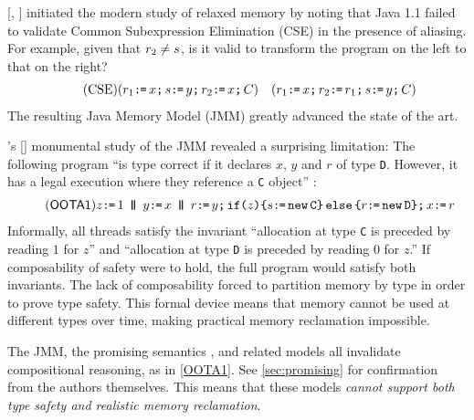 \citeauthor{DBLP:conf/java/Pugh99} [\citeyear{DBLP:conf/java/Pugh99},
] initiated the modern study of relaxed memory by noting that
Java 1.1 failed to validate Common Subexpression Elimination (CSE) in the
presence of aliasing. For example, given that $r_2\neq s$, is it valid
to transform the program on the left to that on the right?
\begin{align*}
\tag{CSE}\label{CSE1}
  ({r_1\texttt{:}\mkern-1mu\texttt{=}\, x \texttt{;}\,\allowbreak
  s\texttt{:}\mkern-1mu\texttt{=}\, y \texttt{;}\,\allowbreak  
  r_2\texttt{:}\mkern-1mu\texttt{=}\, x\texttt{;}\,\allowbreak C})
&&
  ({r_1\texttt{:}\mkern-1mu\texttt{=}\, x \texttt{;}\,\allowbreak     
    r_2\texttt{:}\mkern-1mu\texttt{=}\, r_1\texttt{;}\,\allowbreak
    s\texttt{:}\mkern-1mu\texttt{=}\, y \texttt{;}\,\allowbreak C})
\end{align*}
The resulting Java Memory Model (JMM) \cite{Manson:2005:JMM:1047659.1040336}
greatly advanced the state of the art.

\citeauthor{DBLP:journals/toplas/Lochbihler13}'s
[\citeyear{DBLP:journals/toplas/Lochbihler13}] monumental study of the JMM
revealed a surprising limitation: The following program ``is type correct if
it declares $x$, $y$ and $r$ of type \texttt{D}. However, it has a legal
execution where they reference a \texttt{C} object''
\citep[Fig.~8]{DBLP:journals/toplas/Lochbihler13}:
\begin{gather}
  \taglabel{OOTA1}
  z \GETS 1
  \PAR %
  y\GETS x
  \PAR
  \aReg\GETS y \SEMI \IF{z} \THEN \bReg \GETS \NEW \texttt{C} \ELSE \aReg \GETS \NEW \texttt{D} \FI  \SEMI x \GETS \aReg 
\end{gather}
Informally, all threads satisfy the invariant ``allocation at type \texttt{C}
is preceded by reading $1$ for $z$'' and ``allocation at type \texttt{D} is
preceded by reading $0$ for $z$.''  If composability of safety were to hold,
the full program would satisfy both invariants.  The lack of composability
forced \citeauthor{DBLP:journals/toplas/Lochbihler13} to partition memory by
type in order to prove type safety.  This formal device means that memory
cannot be used at different types over time, making practical memory
reclamation impossible.


The JMM, the promising semantics \cite{DBLP:conf/popl/KangHLVD17}, and
related models
\citep{DBLP:conf/esop/JagadeesanPR10,DBLP:journals/pacmpl/ChakrabortyV19} all
invalidate compositional reasoning, as in \ref{OOTA1}.  See
\textsection\ref{sec:promising} for confirmation from the authors themselves.
This means that these models \emph{cannot support both type safety and
  realistic memory reclamation}.

